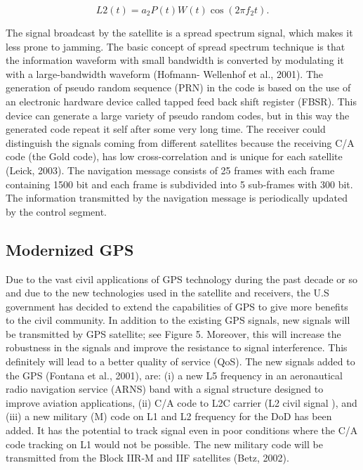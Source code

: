 \begin{equation}
	\label{equ:l1_mod}
	L2(t) = a_{2}P(t)W(t)\cos(2\pi f_{2}t). 
\end{equation}

The signal broadcast by the satellite is a spread spectrum signal, which makes it less prone to
jamming. The basic concept of spread spectrum technique is that the information waveform with
small bandwidth is converted by modulating it with a large-bandwidth waveform (Hofmann-
Wellenhof et al., 2001).
The generation of pseudo random sequence (PRN) in the code is based on the use of an
electronic hardware device called tapped feed back shift register (FBSR). This device can
generate a large variety of pseudo random codes, but in this way the generated code repeat it self
after some very long time. The receiver could distinguish the signals coming from different
satellites because the receiving C/A code (the Gold code), has low cross-correlation and is
unique for each satellite (Leick, 2003).
The navigation message consists of 25 frames with each frame containing 1500 bit and each
frame is subdivided into 5 sub-frames with 300 bit. The information transmitted by the
navigation message is periodically updated by the control segment.

\subsection{Modernized GPS}
Due to the vast civil applications of GPS technology during the past decade or so and due to the
new technologies used in the satellite and receivers, the U.S government has decided to extend
the capabilities of GPS to give more benefits to the civil community. In addition to the existing
GPS signals, new signals will be transmitted by GPS satellite; see Figure 5. Moreover, this will
increase the robustness in the signals and improve the resistance to signal interference. This
definitely will lead to a better quality of service (QoS). The new signals added to the GPS
(Fontana et al., 2001), are: (i) a new L5 frequency in an aeronautical radio navigation service
(ARNS) band with a signal structure designed to improve aviation applications, (ii) C/A code to
L2C carrier (L2 civil signal ), and (iii) a new military (M) code on L1 and L2 frequency for the
DoD has been added. It has the potential to track signal even in poor conditions where the C/A
code tracking on L1 would not be possible. The new military code will be transmitted from the
Block IIR-M and IIF satellites (Betz, 2002).

